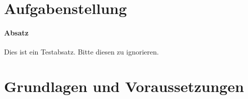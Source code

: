 











\clearpage
\tableofcontents
\newpage

\section{Aufgabenstellung}
\label{sec:aufgabenstellung}

\paragraph{Absatz}
\label{par:absatz}

Dies ist ein Testabsatz. Bitte diesen zu ignorieren.



\section{Grundlagen und Voraussetzungen}
\label{sec:grundlagen_voraussetzungen}

